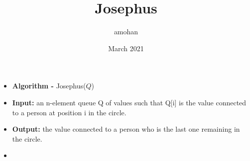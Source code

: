 \documentclass{article}
\title{Josephus}
\author{amohan }
\date{March 2021}
\begin{document}
\begin{itemize}
\item[]
\textbf{Algorithm - }Josephus($Q$)
\item[]
\textbf{Input:} an n-element queue Q of values such that Q[i] is the value connected to a person at position i in the circle.
\item[]
\textbf{Output:} the value connected to a person who is the last one remaining in the circle.


\item[]


\end{itemize}
\end{document}
